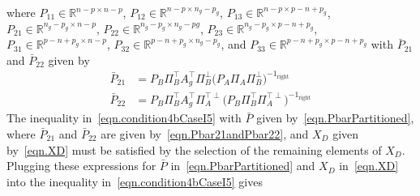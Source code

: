 \documentclass[journal]{IEEEtran}
\theoremstyle{innercustomthm}
\begin{document}
  where $P_{11}\in\mathbb{R}^{n-p \times n-p}$, $P_{12}\in\mathbb{R}^{n-p \times n_{g}-p_{g}}$, $P_{13}\in\mathbb{R}^{n-p \times p-n+p_{g}}$, $P_{21}\in\mathbb{R}^{n_{g}-p_{g} \times n-p}$, $P_{22}\in\mathbb{R}^{n_{g}-p_{g} \times n_{g}-p{g}}$, $P_{23}\in\mathbb{R}^{n_{g}-p_{g} \times p-n+p_{g}}$, $P_{31}\in\mathbb{R}^{p-n+p_{g} \times n-p}$, $P_{32}\in\mathbb{R}^{p-n+p_{g} \times n_{g}-p_{g}}$, and $P_{33}\in\mathbb{R}^{p-n+p_{g} \times p-n+p_{g}}$ with $\bar{P}_{21}$ and $\bar{P}_{22}$ given by
  \begin{equation}
    \label{eqn.Pbar21andPbar22}
    \begin{split}
      \bar{P}_{21}
      &=
      P_{B}\Pi_{B}^{\top}A_{g}^{\top}\Pi_{B}^{\perp}
      \bigr(P_{A}\Pi_{A}\Pi_{B}^{\perp}\bigr)^{-1_{\text{right}}} \\
      \bar{P}_{22}
      &=
      P_{B}\Pi_{B}^{\top}A_{g}^{\top}\Pi_{A}^{\top\perp}\bigr(P_{B}\Pi_{B}^{\top}\Pi_{A}^{\top\perp}\bigr)^{-1_{\text{right}}}
    \end{split}
  \end{equation}
  The inequality in\ \eqref{eqn.condition4bCaseI5} with $\bar{P}$ given by\ \eqref{eqn.PbarPartitioned}, where $\bar{P}_{21}$ and $\bar{P}_{22}$ are given by\ \eqref{eqn.Pbar21andPbar22}, and $X_{D}$ given by\ \eqref{eqn.XD} must be satisfied by the selection of the remaining elements of $X_{D}$.
  Plugging these expressions for $\bar{P}$ in\ \eqref{eqn.PbarPartitioned} and $X_{D}$ in\ \eqref{eqn.XD} into the inequality in\ \eqref{eqn.condition4bCaseI5} gives
\end{document}
